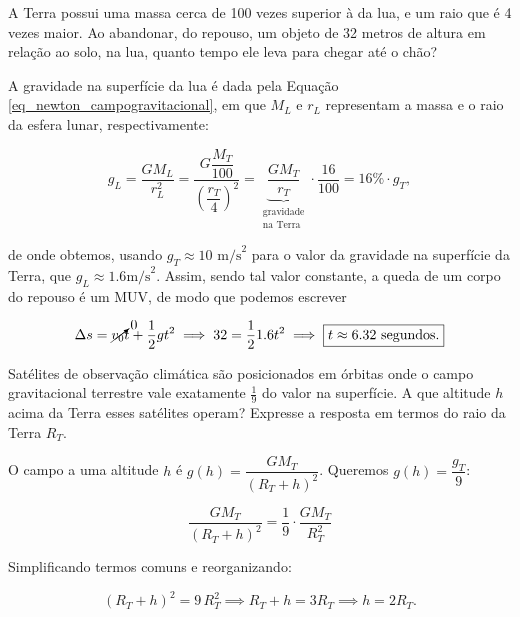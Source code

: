 \begin{exemplo}[Nível I]\label{exemplo_gravitacao_campogravitacionalex01}

A Terra possui uma massa cerca de 100 vezes superior à da lua, e um raio que é 4 vezes maior. Ao abandonar, do repouso, um objeto de 32 metros de altura em relação ao solo, na lua, quanto tempo ele leva para chegar até o chão?

\resolucao

A gravidade na superfície da lua é dada pela Equação \eqref{eq_newton_campogravitacional}, em que $M_L$ e $r_L$ representam a massa e o raio da esfera lunar, respectivamente: 

$$ g_L = \dfrac{GM_L}{r_L^2} = \dfrac{G \dfrac{M_T}{100}}{\left( \dfrac{r_T}{4} \right)^2} =  \underbrace{\dfrac{GM_T}{r_T}}_{\substack{\text{gravidade} \\ \text{na Terra}}}  \cdot \dfrac{16}{100} = 16\% \cdot g_T, $$

\noindent de onde obtemos, usando $g_T\approx 10 \text{ m/s}^2$ para o valor da gravidade na superfície da Terra, que $g_L \approx 1.6 \text{m/s}^2.$ Assim, sendo tal valor constante, a queda de um corpo do repouso é um MUV, de modo que podemos escrever

$$ \Delta s = \cancelto{0}{v_0}t + \dfrac{1}{2}gt^2 \implies 32 = \dfrac{1}{2} 1.6t^2 \implies \boxed{ t \approx 6.32 \text{ segundos.}}$$


\end{exemplo}


\vspace{0.3cm}


\begin{exemplo}[Nível II]\label{exemplo_gravitacao_campogravitacionalex02}

Satélites de observação climática são posicionados em órbitas onde o campo gravitacional
terrestre vale exatamente $\frac{1}{9}$ do valor na superfície. A que altitude $h$ acima da Terra esses
satélites operam? Expresse a resposta em termos do raio da Terra $R_T$.

\resolucao

O campo a uma altitude $h$ é $g(h) = \dfrac{GM_T}{(R_T + h)^2}$. Queremos $g(h) = \dfrac{g_T}{9}$:

$$\frac{GM_T}{(R_T + h)^2} = \frac{1}{9} \cdot \frac{GM_T}{R_T^2}$$

Simplificando termos comuns e reorganizando:

$$(R_T + h)^2 = 9\,R_T^2 \implies R_T + h = 3R_T \implies \boxed{h = 2R_T.}$$





\end{exemplo}




